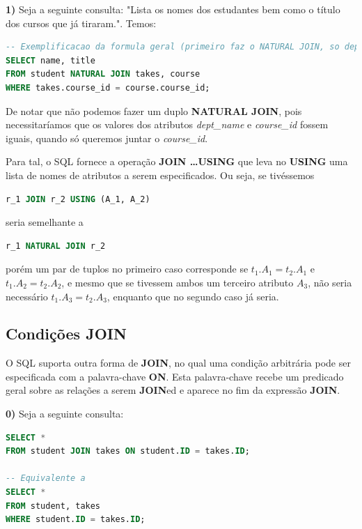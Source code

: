 \documentclass[oneside]{book}
\theoremstyle{definition}
\begin{document}
\textbf{1)} Seja a seguinte consulta: "Lista os nomes dos estudantes bem como o título dos cursos que já tiraram.". Temos:
\begin{lstlisting}[language=SQL, morekeywords={REFERENCES, REFRESH, MATERIALIZED, CONCURRENTLY}, framesep=8pt, xleftmargin=40pt, framexleftmargin=40pt, frame=tb, framerule=0pt]
-- Exemplificacao da formula geral (primeiro faz o NATURAL JOIN, so depois o produto cartesiano)
SELECT name, title
FROM student NATURAL JOIN takes, course
WHERE takes.course_id = course.course_id;
\end{lstlisting}

De notar que não podemos fazer um duplo \textbf{NATURAL JOIN}, pois necessitaríamos que os valores dos atributos \textit{dept\_name} e \textit{course\_id} fossem iguais, quando só queremos juntar o \textit{course\_id}. 

Para tal, o SQL fornece a operação \textbf{JOIN \dots USING} que leva no \textbf{USING} uma lista de nomes de atributos a serem especificados. Ou seja, se tivéssemos 
\begin{lstlisting}[language=SQL, morekeywords={REFERENCES, REFRESH, MATERIALIZED, CONCURRENTLY}, framesep=8pt, xleftmargin=40pt, framexleftmargin=40pt, frame=tb, framerule=0pt]
r_1 JOIN r_2 USING (A_1, A_2)
\end{lstlisting}
seria semelhante a 
\begin{lstlisting}[language=SQL, morekeywords={REFERENCES, REFRESH, MATERIALIZED, CONCURRENTLY}, framesep=8pt, xleftmargin=40pt, framexleftmargin=40pt, frame=tb, framerule=0pt]
r_1 NATURAL JOIN r_2
\end{lstlisting}
porém um par de tuplos no primeiro caso corresponde se $t_1.A_1 = t_2.A_1$ e $t_1.A_2 = t_2.A_2$, e mesmo que se tivessem ambos um terceiro atributo $A_3$, não seria necessário $t_1.A_3 = t_2.A_3$, enquanto que no segundo caso já seria.

\subsection{Condições JOIN}
O SQL suporta outra forma de \textbf{JOIN}, no qual uma condição arbitrária pode ser especificada com a palavra-chave \textbf{ON}. Esta palavra-chave recebe um predicado geral sobre as relações a serem \textbf{JOIN}ed e aparece no fim da expressão \textbf{JOIN}.

\textbf{0)} Seja a seguinte consulta:
\begin{lstlisting}[language=SQL, morekeywords={REFERENCES, REFRESH, MATERIALIZED, CONCURRENTLY}, framesep=8pt, xleftmargin=40pt, framexleftmargin=40pt, frame=tb, framerule=0pt]
SELECT *
FROM student JOIN takes ON student.ID = takes.ID;

-- Equivalente a
SELECT *
FROM student, takes
WHERE student.ID = takes.ID;
\end{lstlisting}
\end{document}
